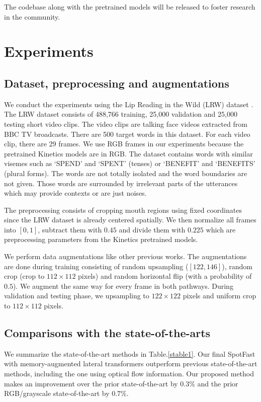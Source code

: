 \documentclass{article}
\begin{document}
The codebase along with the pretrained models will be released to foster research in the community. 
 \section{Experiments}
\subsection{Dataset, preprocessing and augmentations}
We conduct the experiments using the Lip Reading in the Wild (LRW) dataset \cite{chung2016lip}. The LRW dataset consists of 488,766 training, 25,000 validation and 25,000 testing short video clips. The video clips are talking face videos extracted from BBC TV broadcasts. There are 500 target words in this dataset. For each video clip, there are 29 frames. We use RGB frames in our experiments because the pretrained Kinetics models are in RGB. The dataset contains words with similar visemes such as `SPEND' and `SPENT' (tenses) or `BENEFIT' and `BENEFITS' (plural forms). The words are not totally isolated and the word boundaries are not given. Those words are surrounded by irrelevant parts of the utterances which may provide contexts or are just noises.  

The preprocessing consists of cropping mouth regions using fixed coordinates since the LRW dataset is already centered spatially. We then normalize all frames into $[0,1]$, subtract them with $0.45$ and divide them with $0.225$ which are preprocessing parameters from the Kinetics pretrained models.

We perform data augmentations like other previous works. The augmentations are done during training consisting of random upsampling ($[122, 146]$), random crop (crop to $112\times112$ pixels) and random horizontal flip (with a probability of $0.5$). We augment the same way for every frame in both pathways. During validation and testing phase, we upsampling to $122\times122$ pixels and uniform crop to $112\times112$ pixels.

\subsection{Comparisons with the state-of-the-arts}
We summarize the state-of-the-art methods in Table.\ref{stable1}. Our final SpotFast with memory-augmented lateral transformers outperform previous state-of-the-art methods, including the one using optical flow information. Our proposed method makes an improvement over the prior state-of-the-art \cite{weng2019learning} by $0.3\%$ and the prior RGB/grayscale state-of-the-art \cite{Zhang_2019_ICCV} by $0.7\%$.
\end{document}
